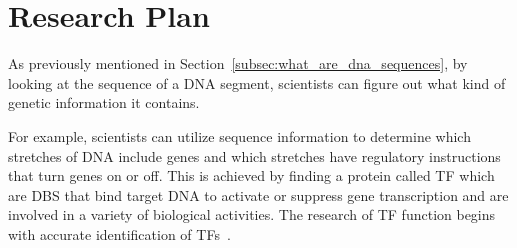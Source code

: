 \chapter{Research Plan}
\label{cha:research_plan}

As previously mentioned in Section~\ref{subsec:what_are_dna_sequences}, by looking at the sequence of a DNA segment, scientists can figure out what kind of genetic information it contains. 

For example, scientists can utilize sequence information to determine which stretches of DNA include genes and which stretches have regulatory instructions that turn genes on or off. This is achieved by finding a protein called \gls{TF} which are \gls{DBS} that bind target DNA to activate or suppress gene transcription and are involved in a variety of biological activities. The research of \gls{TF} function begins with accurate identification of \gls{TF}s~\cite{Hu2019AnimalTFDBFactors}.